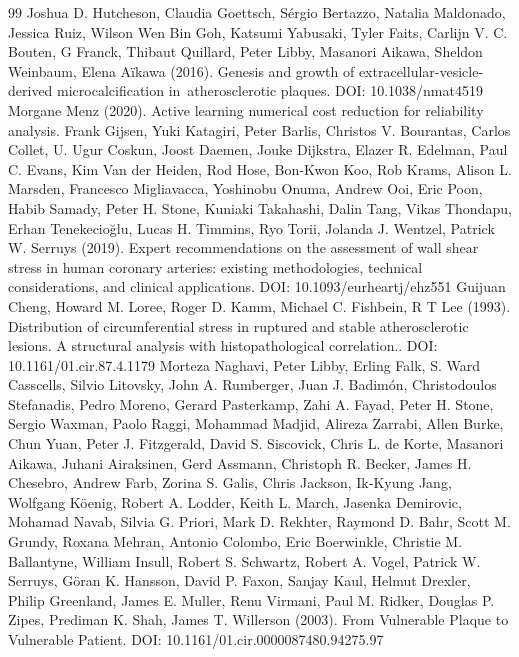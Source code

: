 \documentclass[preprint,12pt]{elsarticle}
\begin{document}
\begin{thebibliography}{99}
 Joshua D. Hutcheson, Claudia Goettsch, Sérgio Bertazzo, Natalia Maldonado, Jessica Ruiz, Wilson Wen Bin Goh, Katsumi Yabusaki, Tyler Faits, Carlijn V. C. Bouten, G Franck, Thibaut Quillard, Peter Libby, Masanori Aikawa, Sheldon Weinbaum, Elena Aïkawa (2016). Genesis and growth of extracellular-vesicle-derived microcalcification in atherosclerotic plaques. DOI: 10.1038/nmat4519
 Morgane Menz (2020). Active learning numerical cost reduction for reliability analysis.
 Frank Gijsen, Yuki Katagiri, Peter Barlis, Christos V. Bourantas, Carlos Collet, U. Ugur Coskun, Joost Daemen, Jouke Dijkstra, Elazer R. Edelman, Paul C. Evans, Kim Van der Heiden, Rod Hose, Bon‐Kwon Koo, Rob Krams, Alison L. Marsden, Francesco Migliavacca, Yoshinobu Onuma, Andrew Ooi, Eric Poon, Habib Samady, Peter H. Stone, Kuniaki Takahashi, Dalin Tang, Vikas Thondapu, Erhan Tenekecioğlu, Lucas H. Timmins, Ryo Torii, Jolanda J. Wentzel, Patrick W. Serruys (2019). Expert recommendations on the assessment of wall shear stress in human coronary arteries: existing methodologies, technical considerations, and clinical applications. DOI: 10.1093/eurheartj/ehz551
 Guijuan Cheng, Howard M. Loree, Roger D. Kamm, Michael C. Fishbein, R T Lee (1993). Distribution of circumferential stress in ruptured and stable atherosclerotic lesions. A structural analysis with histopathological correlation.. DOI: 10.1161/01.cir.87.4.1179
 Morteza Naghavi, Peter Libby, Erling Falk, S. Ward Casscells, Silvio Litovsky, John A. Rumberger, Juan J. Badimón, Christodoulos Stefanadis, Pedro Moreno, Gerard Pasterkamp, Zahi A. Fayad, Peter H. Stone, Sergio Waxman, Paolo Raggi, Mohammad Madjid, Alireza Zarrabi, Allen Burke, Chun Yuan, Peter J. Fitzgerald, David S. Siscovick, Chris L. de Korte, Masanori Aikawa, Juhani Airaksinen, Gerd Assmann, Christoph R. Becker, James H. Chesebro, Andrew Farb, Zorina S. Galis, Chris Jackson, Ik‐Kyung Jang, Wolfgang Köenig, Robert A. Lodder, Keith L. March, Jasenka Demirovic, Mohamad Navab, Silvia G. Priori, Mark D. Rekhter, Raymond D. Bahr, Scott M. Grundy, Roxana Mehran, Antonio Colombo, Eric Boerwinkle, Christie M. Ballantyne, William Insull, Robert S. Schwartz, Robert A. Vogel, Patrick W. Serruys, Göran K. Hansson, David P. Faxon, Sanjay Kaul, Helmut Drexler, Philip Greenland, James E. Muller, Renu Virmani, Paul M. Ridker, Douglas P. Zipes, Prediman K. Shah, James T. Willerson (2003). From Vulnerable Plaque to Vulnerable Patient. DOI: 10.1161/01.cir.0000087480.94275.97

\end{thebibliography}
\end{document}
